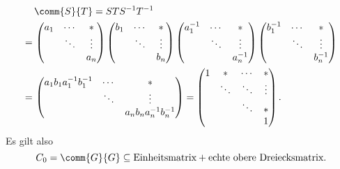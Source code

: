 \begin{align*}
   &\,   \comm{S}{T}
  =       S T S^{-1} T^{-1}
  \\
  =&\,    \begin{pmatrix}
            a_1 & \cdots  & *       \\
                & \ddots  & \vdots  \\
                &         & a_n
          \end{pmatrix}
          \begin{pmatrix}
            b_1 & \cdots  & *       \\
                & \ddots  & \vdots  \\
                &         & b_n
          \end{pmatrix}
          \begin{pmatrix}
            a_1^{-1}  & \cdots  & *       \\
                      & \ddots  & \vdots  \\
                      &         & a_n^{-1}
          \end{pmatrix}
          \begin{pmatrix}
            b_1^{-1}  & \cdots  & *       \\
                      & \ddots  & \vdots  \\
                      &         & b_n^{-1}
          \end{pmatrix}
  \\
  =&\,    \begin{pmatrix}
            a_1 b_1 a_1^{-1} b_1^{-1} & \cdots  & *                         \\
                                      & \ddots  & \vdots                    \\
                                      &         & a_n b_n a_n^{-1} b_n^{-1}
          \end{pmatrix}
  =       \begin{pmatrix}
            1 & *       & \cdots  & *       \\
              & \ddots  & \ddots  & \vdots  \\
              &         & \ddots  & *       \\
              &         &         & 1
          \end{pmatrix}.
\end{align*}
Es gilt also
\begin{equation}
  \label{equation: first commutator}
            C_0
  =         \comm{G}{G}
  \subseteq \text{Einheitsmatrix} + \text{echte obere Dreiecksmatrix}.
\end{equation}



